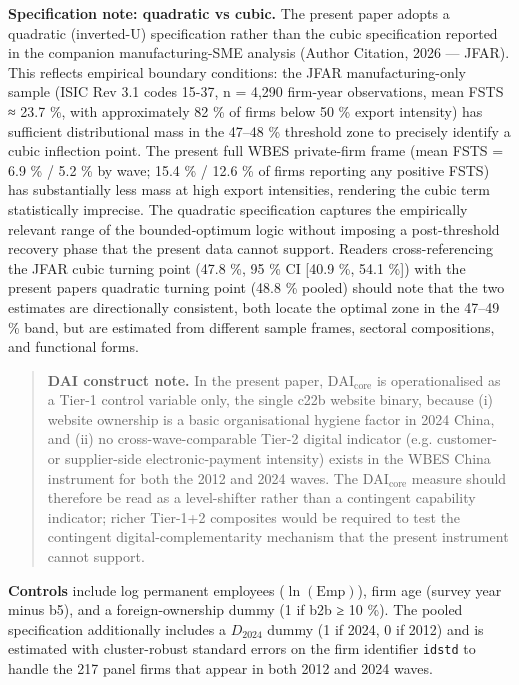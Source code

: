 \documentclass[12pt,a4paper]{article}
\begin{document}
\textbf{Specification note: quadratic vs cubic.} The present paper
adopts a quadratic (inverted-U) specification rather than the cubic
specification reported in the companion manufacturing-SME analysis
(Author Citation, 2026 --- JFAR). This reflects empirical boundary
conditions: the JFAR manufacturing-only sample (ISIC Rev 3.1 codes
15-37, n = 4,290 firm-year observations, mean FSTS ≈ 23.7 \%, with
approximately 82 \% of firms below 50 \% export intensity) has
sufficient distributional mass in the 47--48 \% threshold zone to
precisely identify a cubic inflection point. The present full WBES
private-firm frame (mean FSTS = 6.9 \% / 5.2 \% by wave; 15.4 \% / 12.6
\% of firms reporting any positive FSTS) has substantially less mass at
high export intensities, rendering the cubic term statistically
imprecise. The quadratic specification captures the empirically relevant
range of the bounded-optimum logic without imposing a post-threshold
recovery phase that the present data cannot support. Readers
cross-referencing the JFAR cubic turning point (47.8 \%, 95 \% CI
{[}40.9 \%, 54.1 \%{]}) with the present paper\textquotesingle s
quadratic turning point (48.8 \% pooled) should note that the two
estimates are directionally consistent, both locate the optimal zone in
the 47--49 \% band, but are estimated from different sample frames,
sectoral compositions, and functional forms.

\begin{quote}
\textbf{DAI construct note.} In the present paper,
\(\mathrm{DAI}_{\text{core}}\) is operationalised as a Tier-1 control
variable only, the single c22b website binary, because (i) website
ownership is a basic organisational hygiene factor in 2024 China, and
(ii) no cross-wave-comparable Tier-2 digital indicator (e.g. customer-
or supplier-side electronic-payment intensity) exists in the WBES China
instrument for both the 2012 and 2024 waves. The
\(\mathrm{DAI}_{\text{core}}\) measure should therefore be read as a
level-shifter rather than a contingent capability indicator; richer
Tier-1+2 composites would be required to test the contingent
digital-complementarity mechanism that the present instrument cannot
support.
\end{quote}

\textbf{Controls} include log permanent employees
(\(\ln(\mathrm{Emp})\)), firm age (survey year minus b5), and a
foreign‑ownership dummy (1 if b2b ≥ 10 \%). The pooled specification
additionally includes a \(D_{2024}\) dummy (1 if 2024, 0 if 2012) and is
estimated with cluster-robust standard errors on the firm identifier
\texttt{idstd} to handle the 217 panel firms that appear in both 2012
and 2024 waves.
\end{document}
